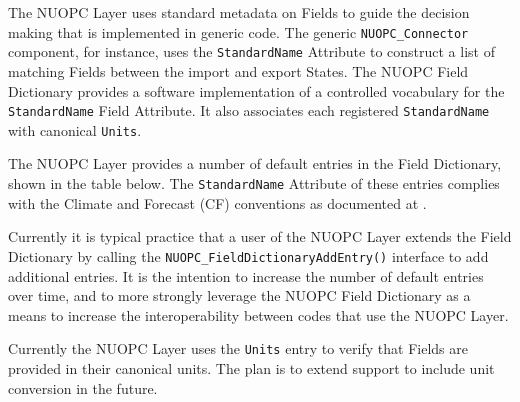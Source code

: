 %

\label{field_dictionary}

The NUOPC Layer uses standard metadata on Fields to guide the decision making that is implemented in generic code. The generic {\tt NUOPC\_Connector} component, for instance, uses the {\tt StandardName} Attribute to construct a list of matching Fields between the import and export States. The NUOPC Field Dictionary provides a software implementation of a controlled vocabulary for the {\tt StandardName} Field Attribute. It also associates each registered {\tt StandardName} with canonical {\tt Units}.

The NUOPC Layer provides a number of default entries in the Field Dictionary, shown in the table below. The {\tt StandardName} Attribute of these entries complies with the Climate and Forecast (CF) conventions as documented at . 

Currently it is typical practice that a user of the NUOPC Layer extends the Field Dictionary by calling the {\tt  NUOPC\_FieldDictionaryAddEntry()} interface to add additional entries. It is the intention to increase the number of default entries over time, and to more strongly leverage the NUOPC Field Dictionary as a means to increase the interoperability between codes that use the NUOPC Layer.

Currently the NUOPC Layer uses the {\tt Units} entry to verify that Fields are provided in their canonical units. The plan is to extend support to include unit conversion in the future.
